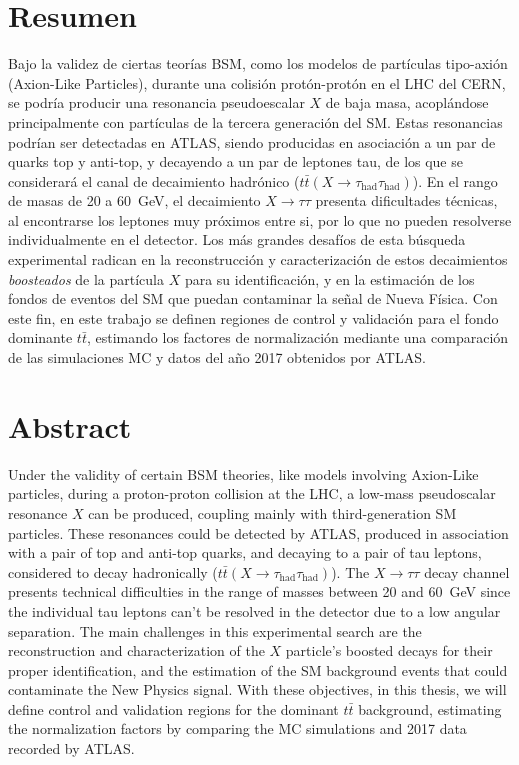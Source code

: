 {
\let\clearpage\relax

\chapter*{Resumen}

Bajo la validez de ciertas teorías BSM, como los modelos de partículas tipo-axión (Axion-Like Particles), durante una colisión protón-protón en el LHC del CERN, se podría producir una resonancia pseudoescalar $X$ de baja masa, acoplándose principalmente con partículas de la tercera generación del SM. Estas resonancias podrían ser detectadas en ATLAS, siendo producidas en asociación a un par de quarks top y anti-top, y decayendo a un par de leptones tau, de los que se considerará el canal de decaimiento hadrónico {\large(}$t\bar{t}(X \to \tau_{\text{had}} \tau_{\text{had}})${\large)}. En el rango de masas de \num{20} a \SI{60}{\GeV}, el decaimiento $X \to \tau\tau$ presenta dificultades técnicas, al encontrarse los leptones muy próximos entre si, por lo que no pueden resolverse individualmente en el detector. Los más grandes desafíos de esta búsqueda experimental radican en la reconstrucción y caracterización de estos decaimientos \textit{boosteados} de la partícula $X$ para su identificación, y en la estimación de los fondos de eventos del SM que puedan contaminar la señal de Nueva Física. Con este fin, en este trabajo se definen regiones de control y validación para el fondo dominante $t\bar{t}$, estimando los factores de normalización mediante una comparación de las simulaciones MC y datos del año 2017 obtenidos por ATLAS.


\vfill


\chapter*{Abstract}

Under the validity of certain BSM theories, like models involving Axion-Like particles, during a proton-proton collision at the LHC, a low-mass pseudoscalar resonance $X$ can be produced, coupling mainly with third-generation SM particles. These resonances could be detected by ATLAS, produced in association with a pair of top and anti-top quarks, and decaying to a pair of tau leptons, considered to decay hadronically {\large(}$t\bar{t}(X \to \tau_{\text{had}} \tau_{\text{had}})${\large)}. The $X \to \tau\tau$ decay channel presents technical difficulties in the range of masses between \num{20} and \SI{60}{\GeV} since the individual tau leptons can't be resolved in the detector due to a low angular separation. The main challenges in this experimental search are the reconstruction and characterization of the $X$ particle's boosted decays for their proper identification, and the estimation of the SM background events that could contaminate the New Physics signal. With these objectives, in this thesis, we will define control and validation regions for the dominant $t\bar{t}$ background, estimating the normalization factors by comparing the MC simulations and 2017 data recorded by ATLAS.

\vfill
\vfill
}

\clearpage{}

\cleardoublepage{}